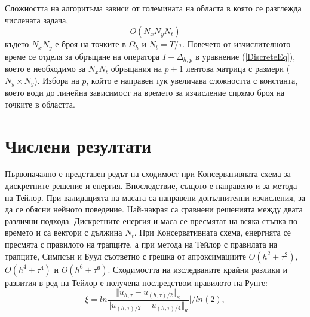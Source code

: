 \documentclass{article}
\newcommand{\rf}[1]{(\ref{#1})}
\begin{document}
Сложността на алгоритъма зависи от големината на областа в която се разглежда числената задача,
$$ O( N_x N_y N_t ) $$
където $N_x N_y$ е броя на точките в $\Omega_h$ и $N_t = T/\tau$. Повечето от изчислителното време се отделя за обръщане на оператора $I-\Delta_{h,p}$ в уравнение \rf{DiscreteEq}, което е необходимо за $N_x N_t$ обръщания на $p+1$ лентова матрица с размери ($N_y \times N_y$). Избора на $p$, който е направен тук увеличава сложността с константа, което води до линейна зависимост на времето за изчисление спрямо броя на точките в областта. 

\section{Числени резултати}

Първоначално е представен редът на сходимост при Консервативната схема за дискретните решение и енергия. Впоследствие, същото е направено и за метода на Тейлор. При валидацията на масата са направени допълнителни изчисления, за да се обясни нейното поведение. Най-накрая са сравнени решенията между двата различни подхода. Дискретните енергия и маса се пресмятат на всяка стъпка по времето и са вектори с дължина $N_t$. При Консервативната схема, енергията се пресмята с правилото на трапците, а при метода на Тейлор с правилата на трапците, Симпсън и Буул съответно с грешка от апроксимациите $O(h^{2} + \tau^2 )$, $O(h^{4} + \tau^4 )$ и $O(h^{6} + \tau^6 )$. Сходимостта на изследваните крайни разлики и развития в ред на Тейлор е получена послредством правилото на Рунге:
\begin{equation}\label{Runge}
\xi = ln  \frac{\Vert u_{h,\tau} - u_{(h,\tau)/2} \Vert_\kappa } {\Vert  u_{(h,\tau)/2} - u_{(h,\tau)/4} \Vert_\kappa  } | / ln(2),
\end{equation}
\end{document}
